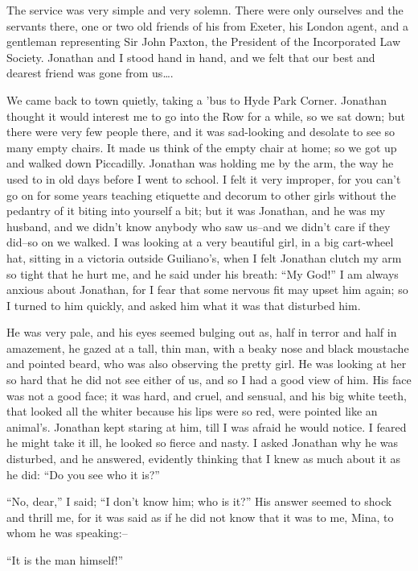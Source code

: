 \documentclass[12pt,openright]{book}
\begin{document}
The service was very simple and very solemn. There were only ourselves and the servants there, one or two old friends of his from Exeter, his London agent, and a gentleman representing Sir John Paxton, the President of the Incorporated Law Society. Jonathan and I stood hand in hand, and we felt that our best and dearest friend was gone from us….

We came back to town quietly, taking a ’bus to Hyde Park Corner. Jonathan thought it would interest me to go into the Row for a while, so we sat down; but there were very few people there, and it was sad-looking and desolate to see so many empty chairs. It made us think of the empty chair at home; so we got up and walked down Piccadilly. Jonathan was holding me by the arm, the way he used to in old days before I went to school. I felt it very improper, for you can’t go on for some years teaching etiquette and decorum to other girls without the pedantry of it biting into yourself a bit; but it was Jonathan, and he was my husband, and we didn’t know anybody who saw us–and we didn’t care if they did–so on we walked. I was looking at a very beautiful girl, in a big cart-wheel hat, sitting in a victoria outside Guiliano’s, when I felt Jonathan clutch my arm so tight that he hurt me, and he said under his breath: “My God!” I am always anxious about Jonathan, for I fear that some nervous fit may upset him again; so I turned to him quickly, and asked him what it was that disturbed him.

He was very pale, and his eyes seemed bulging out as, half in terror and half in amazement, he gazed at a tall, thin man, with a beaky nose and black moustache and pointed beard, who was also observing the pretty girl. He was looking at her so hard that he did not see either of us, and so I had a good view of him. His face was not a good face; it was hard, and cruel, and sensual, and his big white teeth, that looked all the whiter because his lips were so red, were pointed like an animal’s. Jonathan kept staring at him, till I was afraid he would notice. I feared he might take it ill, he looked so fierce and nasty. I asked Jonathan why he was disturbed, and he answered, evidently thinking that I knew as much about it as he did: “Do you see who it is?”

“No, dear,” I said; “I don’t know him; who is it?” His answer seemed to shock and thrill me, for it was said as if he did not know that it was to me, Mina, to whom he was speaking:–

“It is the man himself!”
\end{document}
